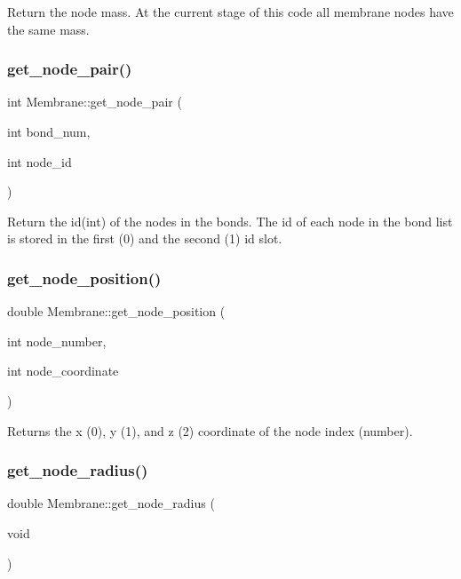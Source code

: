 Return the node mass. At the current stage of this code all membrane nodes have the same mass. \mbox{\label{classMembrane_a522229db4c05a0a927c1c9ac3bf29915}} 
\subsubsection{\texorpdfstring{get\_node\_pair()}{get\_node\_pair()}}
{\footnotesize\ttfamily int Membrane\+::get\+\_\+node\+\_\+pair (\begin{DoxyParamCaption}\item[{int}]{bond\+\_\+num,  }\item[{int}]{node\+\_\+id }\end{DoxyParamCaption})\hspace{0.3cm}{\ttfamily [inline]}}

Return the id(int) of the nodes in the bonds. The id of each node in the bond list is stored in the first (0) and the second (1) id slot. \mbox{\label{classMembrane_a72b951cd255e853e51db5dcaa0bfc9d5}} 
\subsubsection{\texorpdfstring{get\_node\_position()}{get\_node\_position()}}
{\footnotesize\ttfamily double Membrane\+::get\+\_\+node\+\_\+position (\begin{DoxyParamCaption}\item[{int}]{node\+\_\+number,  }\item[{int}]{node\+\_\+coordinate }\end{DoxyParamCaption})\hspace{0.3cm}{\ttfamily [inline]}}

Returns the x (0), y (1), and z (2) coordinate of the node index (number). \mbox{\label{classMembrane_a55c6aba6d26420c0796841125e2a6b98}} 
\subsubsection{\texorpdfstring{get\_node\_radius()}{get\_node\_radius()}}
{\footnotesize\ttfamily double Membrane\+::get\+\_\+node\+\_\+radius (\begin{DoxyParamCaption}\item[{void}]{ }\end{DoxyParamCaption})\hspace{0.3cm}{\ttfamily [inline]}}

